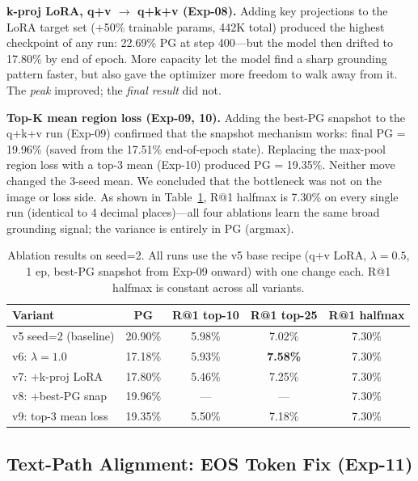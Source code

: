 \documentclass{article}
\begin{document}
\textbf{k-proj LoRA, q+v $\to$ q+k+v (Exp-08).} Adding key projections to the
LoRA target set (+50\% trainable params, 442K total) produced the highest
checkpoint of any run: 22.69\% PG at step 400---but the model then drifted to
17.80\% by end of epoch. More capacity let the model find a sharp grounding
pattern faster, but also gave the optimizer more freedom to walk away from it.
The \emph{peak} improved; the \emph{final result} did not.

\textbf{Top-K mean region loss (Exp-09, 10).} Adding the best-PG snapshot to
the q+k+v run (Exp-09) confirmed that the snapshot mechanism works: final PG
= 19.96\% (saved from the 17.51\% end-of-epoch state). Replacing the max-pool
region loss with a top-3 mean (Exp-10) produced PG = 19.35\%. Neither move
changed the 3-seed mean. We concluded that the bottleneck was not on the image
or loss side. As shown in Table~\ref{tab:ablations}, R@1 halfmax is 7.30\% on
every single run (identical to 4 decimal places)---all four ablations learn the
same broad grounding signal; the variance is entirely in PG (argmax).

\begin{table}[H]
\centering
\caption{Ablation results on seed=2. All runs use the v5 base recipe
(q+v LoRA, $\lambda{=}0.5$, 1 ep, best-PG snapshot from Exp-09 onward)
with one change each. R@1 halfmax is constant across all variants.}
\label{tab:ablations}
\setlength{\tabcolsep}{5pt}
\begin{tabular}{lcccc}
\toprule
Variant & PG & R@1 top-10 & R@1 top-25 & R@1 halfmax \\
\midrule
v5 seed=2 (baseline)      & 20.90\% & 5.98\% & 7.02\% & 7.30\% \\
v6: $\lambda{=}1.0$        & 17.18\% & 5.93\% & \textbf{7.58\%} & 7.30\% \\
v7: +k-proj LoRA           & 17.80\% & 5.46\% & 7.25\% & 7.30\% \\
v8: +best-PG snap          & 19.96\% & ---    & ---    & 7.30\% \\
v9: top-3 mean loss        & 19.35\% & 5.50\% & 7.18\% & 7.30\% \\
\bottomrule
\end{tabular}
\end{table}

\subsection{Text-Path Alignment: EOS Token Fix (Exp-11)}
\label{sec:eos-fix}
\end{document}
